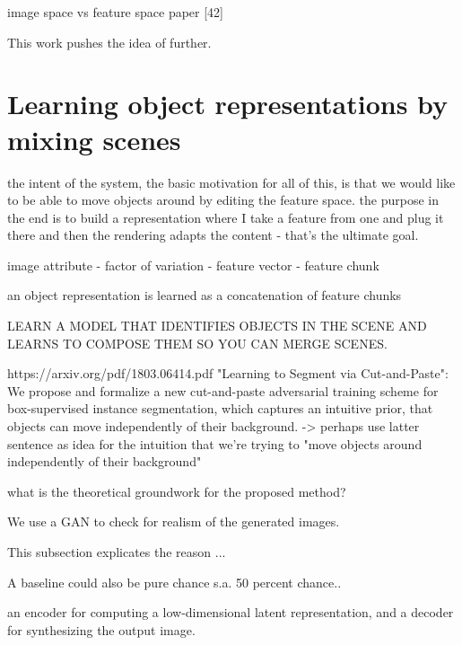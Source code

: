 \documentclass[10pt,letterpaper]{article}
\begin{document}
\par image space vs feature space paper [42]

\par This work pushes the idea of \cite{1711.07410} further.

\section{Learning object representations by mixing scenes}
the intent of the system, the basic motivation for all of this, is that we would like to be able to move objects around by editing the feature space. the purpose in the end is to build a representation where I take a feature from one and plug it there and then the rendering adapts the content - that's the ultimate goal.
\par image attribute - factor of variation - feature vector - feature chunk
\par an object representation is learned as a concatenation of feature chunks

\par LEARN A MODEL THAT IDENTIFIES OBJECTS IN THE SCENE AND LEARNS TO COMPOSE THEM SO YOU CAN MERGE SCENES.

\par https://arxiv.org/pdf/1803.06414.pdf "Learning to Segment via Cut-and-Paste": We propose and formalize a new cut-and-paste adversarial training scheme for box-supervised instance segmentation, which captures an intuitive prior, that objects can move independently of their background.
-> perhaps use latter sentence as idea for the intuition that we're trying to "move objects around independently of their background"

\par what is the theoretical groundwork for the proposed method?

\par We use a GAN to check for realism of the generated images.

\par This subsection explicates the reason ...

\par A baseline could also be pure chance s.a. 50 percent chance..

\par an encoder for computing a low-dimensional latent representation, and a decoder for synthesizing the output image.
\end{document}

